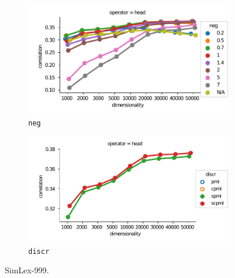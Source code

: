 \begin{figure}[b]
  \centering

  \begin{subfigure}[t]{0.49\textwidth}
  \includegraphics[width=\textwidth]{supplement/figures/SimLex999-interaction-neg}

  \caption{\texttt{neg}}
  \label{fig:SimLex999-neg}
  \end{subfigure}
  \begin{subfigure}[t]{0.49\textwidth}
  \includegraphics[width=\textwidth]{supplement/figures/SimLex999-interaction-discr}

  \caption{\texttt{discr}}
  \label{fig:SimLex999-discr}
  \end{subfigure}

  \caption{SimLex-999.}
\end{figure}
